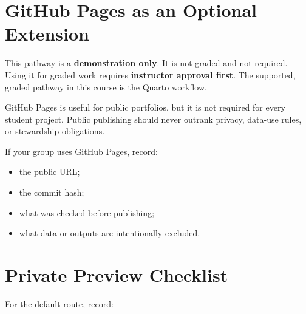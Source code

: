 \documentclass[
  letterpaper,
  DIV=11,
  numbers=noendperiod,
  oneside]{scrreprt}
\providecommand{\tightlist}{%
  \setlength{\itemsep}{0pt}\setlength{\parskip}{0pt}}
\begin{document}
\section*{GitHub Pages as an Optional
Extension}\label{github-pages-as-an-optional-extension}


\begin{tcolorbox}[enhanced jigsaw, title=\textcolor{quarto-callout-warning-color}{\faExclamationTriangle}\hspace{0.5em}{Demo only --- not graded}, arc=.35mm, toptitle=1mm, colframe=quarto-callout-warning-color-frame, toprule=.15mm, leftrule=.75mm, bottomtitle=1mm, opacityback=0, bottomrule=.15mm, coltitle=black, breakable, opacitybacktitle=0.6, titlerule=0mm, colback=white, left=2mm, colbacktitle=quarto-callout-warning-color!10!white, rightrule=.15mm]

This pathway is a \textbf{demonstration only}. It is not graded and not
required. Using it for graded work requires \textbf{instructor approval
first}. The supported, graded pathway in this course is the Quarto
workflow.

\end{tcolorbox}

GitHub Pages is useful for public portfolios, but it is not required for
every student project. Public publishing should never outrank privacy,
data-use rules, or stewardship obligations.

If your group uses GitHub Pages, record:

\begin{itemize}
\tightlist
\item
  the public URL;
\item
  the commit hash;
\item
  what was checked before publishing;
\item
  what data or outputs are intentionally excluded.
\end{itemize}

\section*{Private Preview Checklist}\label{private-preview-checklist}


For the default route, record:
\end{document}
